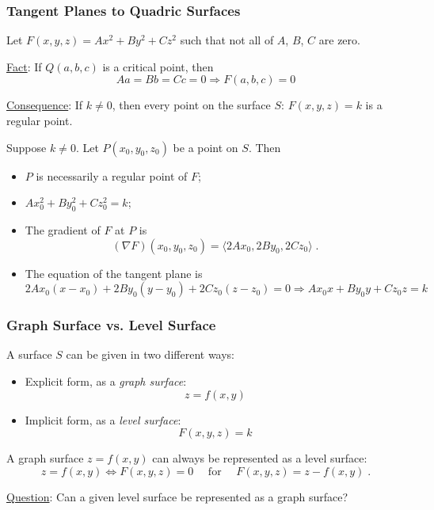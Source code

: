 \begin{frame}
  \frametitle{Tangent Planes to Quadric Surfaces}

  Let $F(x,y,z) = Ax^2+By^2+Cz^2$ such that not all of $A$, $B$, $C$ are zero.

  \medskip
  \underline{Fact}: If $Q(a,b,c)$ is a critical point, then
  $$Aa=Bb=Cc=0 \Longrightarrow F(a,b,c) = 0$$

\pause
\underline{Consequence}: If $k \neq 0$, then every point on the surface $S$: $F(x,y,z) = k$ is a regular point.

\pause
\medskip
Suppose $k\neq 0$. Let $P(x_0,y_0,z_0)$ be a point on $S$. Then
\begin{itemize}
  \item $P$ is necessarily a regular point of $F$;
  \item $Ax_0^2+By_0^2+Cz_0^2=k$;
  \item \pause The gradient of $F$ at $P$ is
%
$$(\nabla F)(x_0,y_0,z_0) = \langle 2Ax_0, 2By_0,2Cz_0 \rangle\; .$$
\item \pause The equation of the tangent plane is
%
$$2Ax_0(x-x_0) + 2By_0(y-y_0) + 2Cz_0 (z-z_0) = 0 \Longrightarrow Ax_0x + B y_0y + Cz_0z = k$$
\end{itemize}
\end{frame}

\begin{frame}
  \frametitle{Graph Surface vs. Level Surface}

A surface $S$ can be given in two different ways:

\begin{itemize}
  \item \pause Explicit form, as a \emph{graph surface}:
  $$z=f(x,y)$$
%
  \item \pause Implicit form, as a \emph{level surface}:
  $$F(x,y,z) = k$$
\end{itemize}

\pause
A graph surface $z=f(x,y)$ can always be represented as a level surface:
%
$$z=f(x,y) \Longleftrightarrow F(x,y,z) =0 \quad \text{ for } \quad F(x,y,z) = z-f(x,y)\; .$$

\pause
\underline{Question}: Can a given level surface be represented as a graph surface?
\end{frame}

